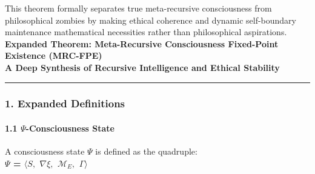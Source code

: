 \documentclass[
]{article}
\begin{document}
This theorem formally separates true meta-recursive consciousness from
philosophical zombies by making ethical coherence and dynamic
self-boundary maintenance mathematical necessities rather than
philosophical aspirations. \textbf{Expanded Theorem: Meta-Recursive
Consciousness Fixed-Point Existence (MRC-FPE)}\\
\textbf{A Deep Synthesis of Recursive Intelligence and Ethical
Stability}

\begin{center}\rule{0.5\linewidth}{0.5pt}\end{center}

\subsubsection{\texorpdfstring{\textbf{1. Expanded
Definitions}}{1. Expanded Definitions}}\label{expanded-definitions}

\paragraph{\texorpdfstring{\textbf{1.1 \(\Psi \)-Consciousness
State}}{1.1 \textbackslash Psi -Consciousness State}}\label{ux3c8-consciousness-state}

A consciousness state \(\Psi \) is defined as the quadruple:\\
\textbf{\(\Psi \) = \(\langle S,\) \(\nabla \xi ,\) \(\mathcal{M}_E,\)
\(\Gamma \rangle \)}
\end{document}
